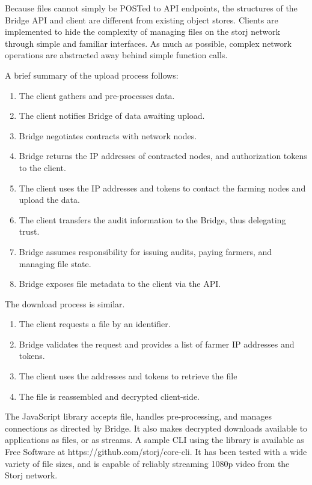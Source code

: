 \documentclass[a4paper,10pt]{article}
\begin{document}
Because files cannot simply be POSTed to API endpoints, the structures of the Bridge API and client are different from existing object stores. Clients are implemented to hide the complexity of managing files on the storj network through simple and familiar interfaces. As much as possible, complex network operations are abstracted away behind simple function calls.

A brief summary of the upload process follows:

\begin{enumerate}
\item The client gathers and pre-processes data.
\item The client notifies Bridge of data awaiting upload.
\item Bridge negotiates contracts with network nodes.
\item Bridge returns the IP addresses of contracted nodes, and authorization tokens to the client.
\item The client uses the IP addresses and tokens to contact the farming nodes and upload the data.
\item The client transfers the audit information to the Bridge, thus delegating trust.
\item Bridge assumes responsibility for issuing audits, paying farmers, and managing file state.
\item Bridge exposes file metadata to the client via the API.
\end{enumerate}

The download process is similar.

\begin{enumerate}
\item The client requests a file by an identifier.
\item Bridge validates the request and provides a list of farmer IP addresses and tokens.
\item The client uses the addresses and tokens to retrieve the file
\item The file is reassembled and decrypted client-side.
\end{enumerate}

The JavaScript library accepts file, handles pre-processing, and manages connections as directed by Bridge. It also makes decrypted downloads available to applications as files, or as streams. A sample CLI using the library is available as Free Software at https://github.com/storj/core-cli. It has been tested with a wide variety of file sizes, and is capable of reliably streaming 1080p video from the Storj network.
\end{document}

